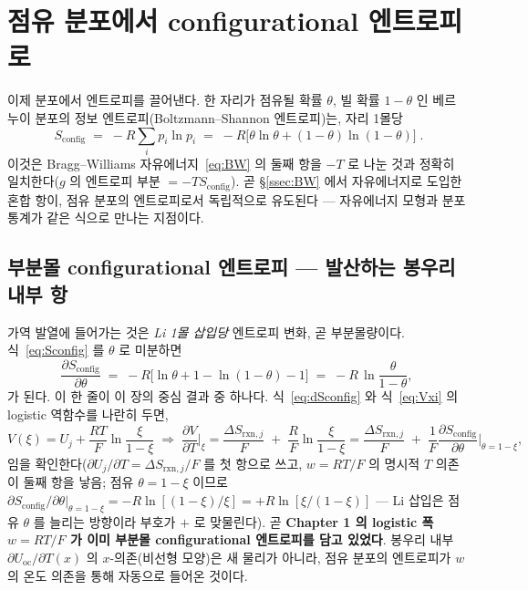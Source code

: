 \documentclass[11pt,a4paper]{article}
\newcommand{\rxn}{\mathrm{rxn}}
\newcommand{\oc}{\mathrm{oc}}
\newcommand{\config}{\mathrm{config}}
\begin{document}
\section{점유 분포에서 configurational 엔트로피로}\label{sec:config}
이제 분포에서 엔트로피를 끌어낸다. 한 자리가 점유될 확률 $\theta$, 빌 확률 $1-\theta$ 인 베르누이 분포의
정보 엔트로피(Boltzmann--Shannon 엔트로피)는, 자리 1몰당
\begin{equation}
\boxed{\;S_\config \;=\; -R\sum_i p_i\ln p_i
\;=\; -R\bigl[\theta\ln\theta + (1-\theta)\ln(1-\theta)\bigr]\;.}
\label{eq:Sconfig}
\end{equation}
이것은 Bragg--Williams 자유에너지~\eqref{eq:BW} 의 둘째 항을 $-T$ 로 나눈 것과 정확히 일치한다($g$ 의 엔트로피
부분 $=-T S_\config$). 곧 \S\ref{ssec:BW} 에서 자유에너지로 도입한 혼합 항이, 점유 분포의 엔트로피로서
독립적으로 유도된다 — 자유에너지 모형과 분포 통계가 같은 식으로 만나는 지점이다.

\subsection{부분몰 configurational 엔트로피 — 발산하는 봉우리 내부 항}
가역 발열에 들어가는 것은 \emph{Li 1몰 삽입당} 엔트로피 변화, 곧 부분몰량이다. 식~\eqref{eq:Sconfig} 를
$\theta$ 로 미분하면
\begin{equation}
\frac{\partial S_\config}{\partial\theta}
\;=\; -R\bigl[\ln\theta + 1 - \ln(1-\theta) - 1\bigr]
\;=\; -R\,\ln\!\frac{\theta}{1-\theta},
\label{eq:dSconfig}
\end{equation}
가 된다. 이 한 줄이 이 장의 중심 결과 중 하나다. 식~\eqref{eq:dSconfig} 와 식~\eqref{eq:Vxi} 의 logistic
역함수를 나란히 두면,
\begin{equation}
V(\xi)=U_j+\frac{RT}{F}\ln\!\frac{\xi}{1-\xi}
\;\Longrightarrow\;
\frac{\partial V}{\partial T}\Big|_\xi
= \frac{\Delta S_{\rxn,j}}{F}\;+\;\frac{R}{F}\ln\!\frac{\xi}{1-\xi}
= \frac{\Delta S_{\rxn,j}}{F}\;+\;\frac{1}{F}\frac{\partial S_\config}{\partial\theta}\Big|_{\theta=1-\xi},
\label{eq:dVdT_config}
\end{equation}
임을 확인한다($\partial U_j/\partial T=\Delta S_{\rxn,j}/F$ 를 첫 항으로 쓰고, $w=RT/F$ 의 명시적 $T$ 의존이
둘째 항을 낳음; 점유 $\theta=1-\xi$ 이므로 $\partial S_\config/\partial\theta|_{\theta=1-\xi}=-R\ln[(1-\xi)/\xi]
=+R\ln[\xi/(1-\xi)]$ — Li 삽입은 점유 $\theta$ 를 늘리는 방향이라 부호가 $+$ 로 맞물린다). 곧 \textbf{Chapter 1 의
logistic 폭 $w=RT/F$ 가 이미 부분몰 configurational 엔트로피를 담고 있었다}. 봉우리 내부 $\partial U_\oc/\partial T(x)$
의 $x$-의존(비선형 모양)은 새 물리가 아니라, 점유 분포의 엔트로피가 $w$ 의 온도 의존을 통해 자동으로 들어온 것이다.
\end{document}
